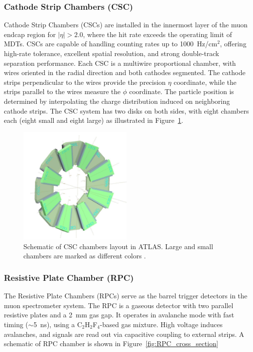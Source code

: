 \subsubsection{Cathode Strip Chambers (CSC)}
Cathode Strip Chambers (CSCs) are installed in the innermost layer of the muon endcap region for $|\eta| > 2.0$, where the hit rate exceeds the operating limit of MDTs. CSCs are capable of handling counting rates up to 1000~Hz/cm$^2$, offering high-rate tolerance, excellent spatial resolution, and strong double-track separation performance. Each CSC is a multiwire proportional chamber, with wires oriented in the radial direction and both cathodes segmented. The cathode strips perpendicular to the wires provide the precision $\eta$ coordinate, while the strips parallel to the wires measure the $\phi$ coordinate. The particle position is determined by interpolating the charge distribution induced on neighboring cathode strips. The CSC system has two disks on both sides, with eight chambers each (eight small and eight large) as illustrated in Figure~\ref{fig:CSC_layout}.

\begin{figure}[htbp]
  \centering
  \includegraphics[width=0.5\textwidth]{figs/chapter2/CSC_layout.png}
  \caption{Schematic of CSC chambers layout in ATLAS. Large and small chambers are marked as different colors \cite{ATLASDetector2008}.}
  \label{fig:CSC_layout}
\end{figure}

\subsubsection{Resistive Plate Chamber (RPC)}
The Resistive Plate Chambers (RPCs) serve as the barrel trigger detectors in the muon spectrometer system. The RPC is a gaseous detector with two parallel resistive plates and a 2~mm gas gap. It operates in avalanche mode with fast timing ($\sim$5~ns), using a C$_2$H$_2$F$_4$-based gas mixture. High voltage induces avalanches, and signals are read out via capacitive coupling to external strips. A schematic of RPC chamber is shown in Figure~\ref{fig:RPC_cross_section}


